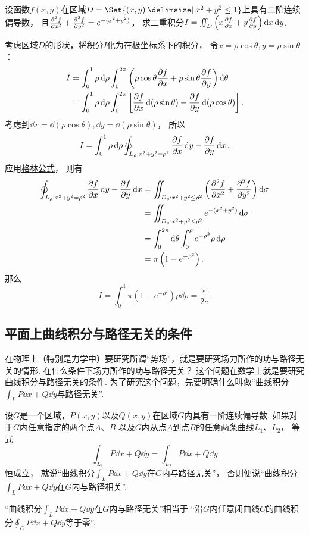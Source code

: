 \begin{example}
设函数\(f(x,y)\)在区域\(D=\Set{(x,y) \given x^2+y^2\leq1}\)上具有二阶连续偏导数，
且\(\pdv[2]{f}{x}+\pdv[2]{f}{y}=e^{-(x^2+y^2)}\)，
求二重积分\(I=\iint_D\left(x\pdv{f}{x}+y\pdv{f}{y}\right)\dd{x}\dd{y}\).
\begin{solution}
考虑区域\(D\)的形状，将积分\(I\)化为在极坐标系下的积分，
令\(x=\rho\cos\theta, y=\rho\sin\theta\)：
\begin{align*}
	I &= \int_0^1 \rho\dd{\rho} \int_0^{2\pi}
		\left(\rho\cos\theta\pdv{f}{x}+\rho\sin\theta\pdv{f}{y}\right) \dd{\theta} \\
	&= \int_0^1 \rho\dd{\rho} \int_0^{2\pi}
		\left[\pdv{f}{x}\dd(\rho\sin\theta)-\pdv{f}{y}\dd(\rho\cos\theta)\right].
\end{align*}
考虑到\(\dd{x}=\dd(\rho\cos\theta),
\dd{y}=\dd(\rho\sin\theta)\)，
所以\[
	I = \int_0^1 \rho\dd{\rho} \oint_{L_{\rho}: x^2+y^2=\rho^2} \pdv{f}{x}\dd{y}-\pdv{f}{y}\dd{x}.
\]
应用\hyperref[equation:线积分与面积分.格林公式]{格林公式}，
则有\begin{align*}
	\oint_{L_{\rho}: x^2+y^2=\rho^2} \pdv{f}{x}\dd{y}-\pdv{f}{y}\dd{x}
	&= \iint_{D_{\rho}: x^2+y^2\leq\rho^2} \left(\pdv[2]{f}{x}+\pdv[2]{f}{y}\right) \dd{\sigma} \\
	&= \iint_{D_{\rho}: x^2+y^2\leq\rho^2} e^{-(x^2+y^2)} \dd{\sigma} \\
	&= \int_0^{2\pi} \dd{\theta} \int_0^{\rho} e^{-\rho^2} \rho\dd{\rho} \\
	&= \pi \left(1-e^{-\rho^2}\right).
\end{align*}
那么\[
	I = \int_0^1 \pi \left(1-e^{-\rho^2}\right) \rho\dd{\rho}
	=  \frac{\pi}{2e}.
\]
\end{solution}
\end{example}

\subsection{平面上曲线积分与路径无关的条件}
在物理上（特别是力学中）要研究所谓“势场”，就是要研究场力所作的功与路径无关的情形.
在什么条件下场力所作的功与路径无关？
这个问题在数学上就是要研究曲线积分与路径无关的条件.
为了研究这个问题，先要明确什么叫做“曲线积分\(\int_L P\dd{x}+Q\dd{y}\)与路径无关”.
\begin{definition}
设\(G\)是一个区域，\(P(x,y)\)以及\(Q(x,y)\)在区域\(G\)内具有一阶连续偏导数.
如果对于\(G\)内任意指定的两个点\(A\)、\(B\)
以及\(G\)内从点\(A\)到点\(B\)的任意两条曲线\(L_1\)、\(L_2\)，
等式\[
	\int_{L_1}{P\dd{x}+Q\dd{y}}
	=\int_{L_2}{P\dd{x}+Q\dd{y}}
\]恒成立，
就说“曲线积分\(\int_L P\dd{x}+Q\dd{y}\)在\(G\)内与路径无关”，
否则便说“曲线积分\(\int_L P\dd{x}+Q\dd{y}\)在\(G\)内与路径相关”.
\end{definition}
“曲线积分\(\int_L P\dd{x}+Q\dd{y}\)在\(G\)内与路径无关”相当于
“沿\(G\)内任意闭曲线\(C\)的曲线积分\(\oint_C P\dd{x}+Q\dd{y}\)等于零”.

